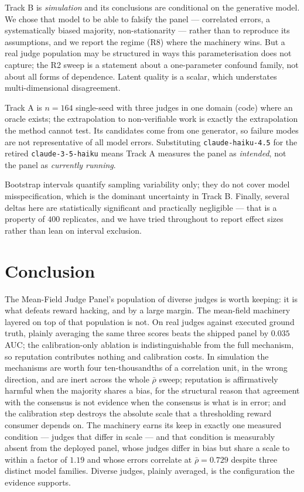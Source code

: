 \documentclass[11pt]{article}
\theoremstyle{definition}
\newcommand{\rhobar}{\ensuremath{\bar{\rho}}}
\begin{document}
Track B is \emph{simulation} and its conclusions are conditional on the generative model. We
chose that model to be able to falsify the panel --- correlated errors, a systematically biased
majority, non-stationarity --- rather than to reproduce its assumptions, and we report the
regime (R8) where the machinery wins. But a real judge population may be structured in ways
this parameterisation does not capture; the R2 sweep is a statement about a one-parameter
confound family, not about all forms of dependence. Latent quality is a scalar, which
understates multi-dimensional disagreement.

Track A is $n=164$ single-seed with three judges in one domain (code) where an oracle exists;
the extrapolation to non-verifiable work is exactly the extrapolation the method cannot test.
Its candidates come from one generator, so failure modes are not representative of all model
errors. Substituting \texttt{claude-haiku-4.5} for the retired \texttt{claude-3-5-haiku} means
Track A measures the panel as \emph{intended}, not the panel as \emph{currently running}.

Bootstrap intervals quantify sampling variability only; they do not cover model
misspecification, which is the dominant uncertainty in Track B. Finally, several deltas here
are statistically significant and practically negligible --- that is a property of $400$
replicates, and we have tried throughout to report effect sizes rather than lean on interval
exclusion.

\section{Conclusion}

The Mean-Field Judge Panel's population of diverse judges is worth keeping: it is what defeats
reward hacking, and by a large margin. The mean-field machinery layered on top of that
population is not. On real judges against executed ground truth, plainly averaging the same
three scores beats the shipped panel by $0.035$ AUC; the calibration-only ablation is
indistinguishable from the full mechanism, so reputation contributes nothing and calibration
costs. In simulation the mechanisms are worth four ten-thousandths of a correlation unit, in
the wrong direction, and are inert across the whole \rhobar{} sweep; reputation is
affirmatively harmful when the majority shares a bias, for the structural reason that
agreement with the consensus is not evidence when the consensus is what is in error; and the
calibration step destroys the absolute scale that a thresholding reward consumer depends on.
The machinery earns its keep in exactly one measured condition --- judges that differ in scale
--- and that condition is measurably absent from the deployed panel, whose judges differ in
bias but share a scale to within a factor of $1.19$ and whose errors correlate at
$\rhobar=0.729$ despite three distinct model families. Diverse judges, plainly averaged, is
the configuration the evidence supports.
\end{document}
